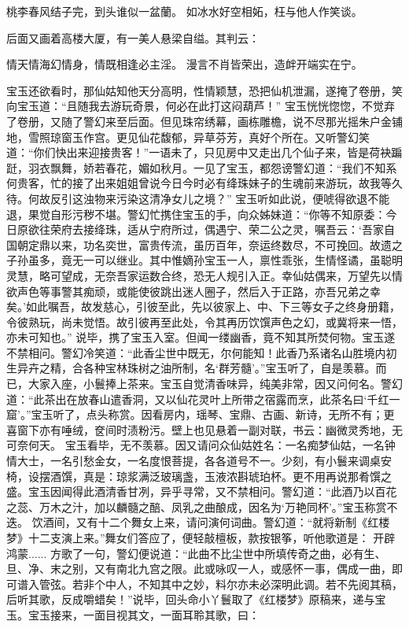 \documentclass[12pt,oneside]{book}
\begin{document}
桃李春风结子完，到头谁似一盆蘭。
如冰水好空相妬，枉与他人作笑谈。

后面又画着高楼大厦，有一美人悬梁自缢。其判云：

情天情海幻情身，情既相逢必主淫。
漫言不肖皆荣出，造衅开端实在宁。

宝玉还欲看时，那仙姑知他天分高明，性情颖慧，恐把仙机泄漏，遂掩了卷册，笑向宝玉道：“且随我去游玩奇景，何必在此打这闷葫芦！”
宝玉恍恍惚惚，不觉弃了卷册，又随了警幻来至后面。但见珠帘绣幕，画栋雕檐，说不尽那光摇朱户金铺地，雪照琼窗玉作宫。更见仙花馥郁，异草芬芳，真好个所在。又听警幻笑道：“你们快出来迎接贵客！”一语未了，只见房中又走出几个仙子来，皆是荷袂蹁跹，羽衣飘舞，娇若春花，媚如秋月。一见了宝玉，都怨谤警幻道：“我们不知系何贵客，忙的接了出来姐姐曾说今日今时必有绛珠妹子的生魂前来游玩，故我等久待。何故反引这浊物来污染这清净女儿之境？”
宝玉听如此说，便唬得欲退不能退，果觉自形污秽不堪。警幻忙携住宝玉的手，向众姊妹道：“你等不知原委：今日原欲往荣府去接绛珠，适从宁府所过，偶遇宁、荣二公之灵，嘱吾云：‘吾家自国朝定鼎以来，功名奕世，富贵传流，虽历百年，奈运终数尽，不可挽回。故遗之子孙虽多，竟无一可以继业。其中惟嫡孙宝玉一人，禀性乖张，生情怪谲，虽聪明灵慧，略可望成，无奈吾家运数合终，恐无人规引入正。幸仙姑偶来，万望先以情欲声色等事警其痴顽，或能使彼跳出迷人圈子，然后入于正路，亦吾兄弟之幸矣。’如此嘱吾，故发慈心，引彼至此，先以彼家上、中、下三等女子之终身册籍，令彼熟玩，尚未觉悟。故引彼再至此处，令其再历饮馔声色之幻，或冀将来一悟，亦未可知也。”
说毕，携了宝玉入室。但闻一缕幽香，竟不知其所焚何物。宝玉遂不禁相问。警幻冷笑道：“此香尘世中既无，尔何能知！此香乃系诸名山胜境内初生异卉之精，合各种宝林珠树之油所制，名‘群芳髓’。”宝玉听了，自是羡慕。而已，大家入座，小鬟捧上茶来。宝玉自觉清香味异，纯美非常，因又问何名。警幻道：“此茶出在放春山遣香洞，又以仙花灵叶上所带之宿露而烹，此茶名曰‘千红一窟’。”宝玉听了，点头称赏。因看房内，瑶琴、宝鼎、古画、新诗，无所不有；更喜窗下亦有唾绒，奁间时渍粉污。壁上也见悬着一副对联，书云：幽微灵秀地，无可奈何天。
宝玉看毕，无不羡慕。因又请问众仙姑姓名：一名痴梦仙姑，一名钟情大士，一名引愁金女，一名度恨菩提，各各道号不一。少刻，有小鬟来调桌安椅，设摆酒馔，真是：琼浆满泛玻璃盏，玉液浓斟琥珀杯。更不用再说那肴馔之盛。宝玉因闻得此酒清香甘冽，异乎寻常，又不禁相问。警幻道：“此酒乃以百花之蕊、万木之汁，加以麟髓之醅、凤乳之曲酿成，因名为‘万艳同杯’。”宝玉称赏不迭。
饮酒间，又有十二个舞女上来，请问演何词曲。警幻道：“就将新制《红楼梦》十二支演上来。”舞女们答应了，便轻敲檀板，款按银筝，听他歌道是：
开辟鸿蒙......
方歌了一句，警幻便说道：“此曲不比尘世中所填传奇之曲，必有生、旦、净、末之别，又有南北九宫之限。此或咏叹一人，或感怀一事，偶成一曲，即可谱入管弦。若非个中人，不知其中之妙，料尔亦未必深明此调。若不先阅其稿，后听其歌，反成嚼蜡矣！”说毕，回头命小丫鬟取了《红楼梦》原稿来，递与宝玉。宝玉接来，一面目视其文，一面耳聆其歌，曰：
\end{document}
